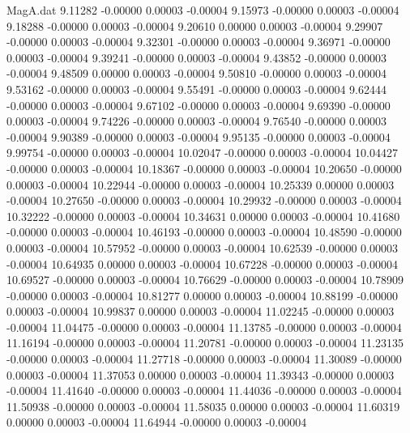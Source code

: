 \begin{filecontents}{MagA.dat}
   9.11282   -0.00000    0.00003   -0.00004
   9.15973   -0.00000    0.00003   -0.00004
   9.18288   -0.00000    0.00003   -0.00004
   9.20610    0.00000    0.00003   -0.00004
   9.29907   -0.00000    0.00003   -0.00004
   9.32301   -0.00000    0.00003   -0.00004
   9.36971   -0.00000    0.00003   -0.00004
   9.39241   -0.00000    0.00003   -0.00004
   9.43852   -0.00000    0.00003   -0.00004
   9.48509    0.00000    0.00003   -0.00004
   9.50810   -0.00000    0.00003   -0.00004
   9.53162   -0.00000    0.00003   -0.00004
   9.55491   -0.00000    0.00003   -0.00004
   9.62444   -0.00000    0.00003   -0.00004
   9.67102   -0.00000    0.00003   -0.00004
   9.69390   -0.00000    0.00003   -0.00004
   9.74226   -0.00000    0.00003   -0.00004
   9.76540   -0.00000    0.00003   -0.00004
   9.90389   -0.00000    0.00003   -0.00004
   9.95135   -0.00000    0.00003   -0.00004
   9.99754   -0.00000    0.00003   -0.00004
  10.02047   -0.00000    0.00003   -0.00004
  10.04427   -0.00000    0.00003   -0.00004
  10.18367   -0.00000    0.00003   -0.00004
  10.20650   -0.00000    0.00003   -0.00004
  10.22944   -0.00000    0.00003   -0.00004
  10.25339    0.00000    0.00003   -0.00004
  10.27650   -0.00000    0.00003   -0.00004
  10.29932   -0.00000    0.00003   -0.00004
  10.32222   -0.00000    0.00003   -0.00004
  10.34631    0.00000    0.00003   -0.00004
  10.41680   -0.00000    0.00003   -0.00004
  10.46193   -0.00000    0.00003   -0.00004
  10.48590   -0.00000    0.00003   -0.00004
  10.57952   -0.00000    0.00003   -0.00004
  10.62539   -0.00000    0.00003   -0.00004
  10.64935    0.00000    0.00003   -0.00004
  10.67228   -0.00000    0.00003   -0.00004
  10.69527   -0.00000    0.00003   -0.00004
  10.76629   -0.00000    0.00003   -0.00004
  10.78909   -0.00000    0.00003   -0.00004
  10.81277    0.00000    0.00003   -0.00004
  10.88199   -0.00000    0.00003   -0.00004
  10.99837    0.00000    0.00003   -0.00004
  11.02245   -0.00000    0.00003   -0.00004
  11.04475   -0.00000    0.00003   -0.00004
  11.13785   -0.00000    0.00003   -0.00004
  11.16194   -0.00000    0.00003   -0.00004
  11.20781   -0.00000    0.00003   -0.00004
  11.23135   -0.00000    0.00003   -0.00004
  11.27718   -0.00000    0.00003   -0.00004
  11.30089   -0.00000    0.00003   -0.00004
  11.37053    0.00000    0.00003   -0.00004
  11.39343   -0.00000    0.00003   -0.00004
  11.41640   -0.00000    0.00003   -0.00004
  11.44036   -0.00000    0.00003   -0.00004
  11.50938   -0.00000    0.00003   -0.00004
  11.58035    0.00000    0.00003   -0.00004
  11.60319    0.00000    0.00003   -0.00004
  11.64944   -0.00000    0.00003   -0.00004

\end{filecontents}
